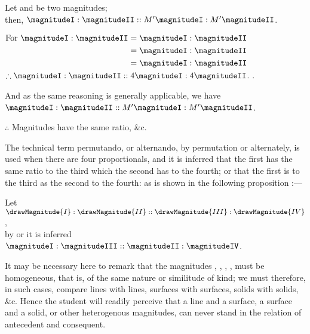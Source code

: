 \documentclass{byrne-book}
\begin{document}
\begin{center}
Let  and  be two magnitudes;\\
then, $\magnitudeI : \magnitudeII :: M' \magnitudeI : M' \magnitudeII$.

$\begin{aligned}
\mbox{For } \magnitudeI : \magnitudeII &= \magnitudeI : \magnitudeII \\
&= \magnitudeI : \magnitudeII \\
&= \magnitudeI : \magnitudeII \\
\end{aligned}$\\
$\therefore \magnitudeI : \magnitudeII :: 4 \magnitudeI : 4 \magnitudeII$. .

And as the same reasoning is generally applicable, we have\\
$\magnitudeI : \magnitudeII :: M' \magnitudeI : M' \magnitudeII$.

$\therefore$ Magnitudes have the same ratio, \&c.
\end{center}


\vfill\pagebreak

\label{def:V.XIII} 
The technical term permutando, or alternando, by permutation or alternately, is used when there are four proportionals, and it is inferred that the first has the same ratio to the third which the second has to the fourth; or that the first is to the third as the second to the fourth: as is shown in the following proposition :—

\begin{center}
Let $\drawMagnitude{I} : \drawMagnitude{II} :: \drawMagnitude{III} : \drawMagnitude{IV}$,\\
by  or  it is inferred\\
$\magnitudeI : \magnitudeIII :: \magnitudeII : \magnitudeIV$.
\end{center}

It may be necessary here to remark that the magnitudes \magnitudeI, \magnitudeII, \magnitudeIII, \magnitudeIV, must be homogeneous, that is, of the same nature or similitude of kind; we must therefore, in such cases, compare lines with lines, surfaces with surfaces, solids with solids, \&c. Hence the student will readily perceive that a line and a surface, a surface and a solid, or other heterogenous magnitudes, can never stand in the relation of antecedent and consequent.
\end{document}
